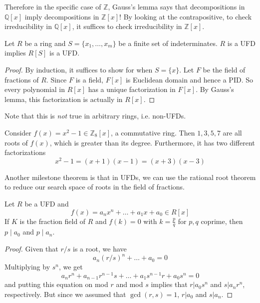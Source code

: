   Therefore in the specific case of $\mathbb{Z}$, Gauss's lemma says that decompositions in $\mathbb{Q}[x]$ imply decompositions in $\mathbb{Z}[x]$! By looking at the contrapositive, to check irreducibility in $\mathbb{Q}[x]$, it suffices to check irreducibility in $\mathbb{Z}[x]$. 

  \begin{theorem}
    Let $R$ be a ring and $S = \{x_1, \ldots, x_m\}$ be a finite set of indeterminates. $R$ is a UFD implies $R[S]$ is a UFD. 
  \end{theorem}
  \begin{proof}
    By induction, it suffices to show for when $S = \{x\}$. Let $F$ be the field of fractions of $R$. Since $F$ is a field, $F[x]$ is Euclidean domain and hence a PID. So every polynomial in $R[x]$ has a unique factorization in $F[x]$. By Gauss's lemma, this factorization is actually in $R[x]$. 
  \end{proof}

  Note that this is \textit{not} true in arbitrary rings, i.e. non-UFDs. 

  \begin{example}
    Consider $f(x) = x^2 - 1 \in \mathbb{Z}_8 [x]$, a commutative ring. Then $1, 3, 5, 7$ are all roots of $f(x)$, which is greater than its degree. Furthermore, it has two different factorizations 
    \begin{equation}
      x^2 - 1 = (x + 1)(x - 1) = (x + 3)(x - 3)
    \end{equation}
  \end{example} 

  Another milestone theorem is that in UFDs, we can use the rational root theorem to reduce our search space of roots in the field of fractions.  

  \begin{theorem}
    Let $R$ be a UFD and 
    \begin{equation}
      f(x) = a_n x^n + \ldots + a_1 x + a_0 \in R[x] 
    \end{equation}
    If $K$ is the fraction field of $R$ and $f(k) = 0$ with $k = \frac{p}{q}$ for $p, q$ coprime, then $p \mid a_0$ and $p \mid a_n$. 
  \end{theorem}
  \begin{proof}
    Given that $r/s$ is a root, we have 
    \begin{equation}
      a_n (r/s)^n + \ldots + a_0 = 0
    \end{equation}
    Multiplying by $s^n$, we get 
    \begin{equation}
      a_n r^n + a_{n-1} r^{n-1} s + \ldots + a_1 s^{n-1} r + a_0 s^n = 0
    \end{equation}
    and putting this equation on mod $r$ and mod $s$ implies that $r | a_0 s^n$ and $s | a_n r^n$, respectively. But since we assumed that $\gcd (r, s) = 1$, $r | a_0$ and $s | a_n$. 
  \end{proof}

